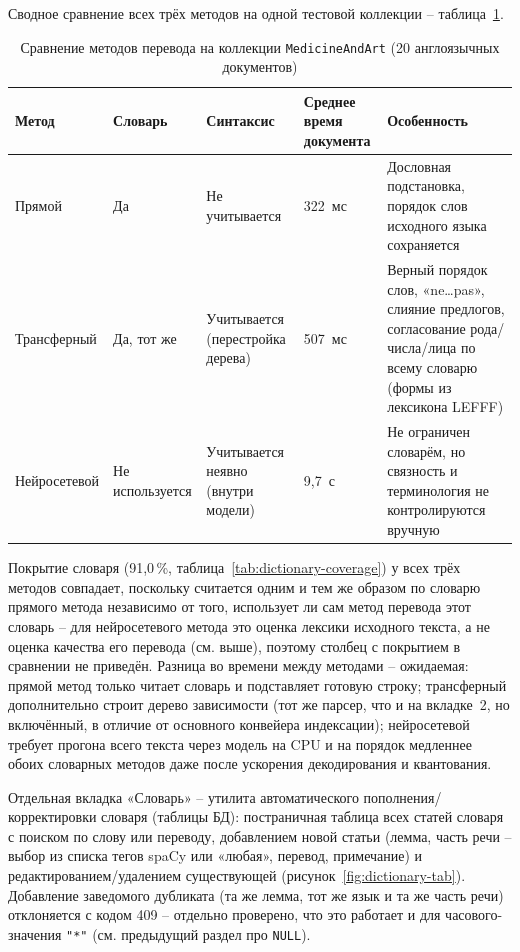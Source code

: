 Сводное сравнение всех трёх методов на одной тестовой коллекции --
таблица~\ref{tab:method-comparison}.

\begin{table}[H]
  \centering
  \caption{Сравнение методов перевода на коллекции \texttt{MedicineAndArt} (20 англоязычных документов)}
  \label{tab:method-comparison}
  \small
  \begin{tabularx}{\textwidth}{|l|X|X|X|X|}
    \hline
    Метод & Словарь & Синтаксис & Среднее время документа & Особенность \\
    \hline
    Прямой & Да & Не учитывается & 322~мс & Дословная подстановка, порядок слов исходного языка сохраняется \\
    \hline
    Трансферный & Да, тот же & Учитывается (перестройка дерева) & 507~мс & Верный порядок слов, «ne\ldots pas», слияние предлогов, согласование рода/числа/лица по всему словарю (формы из лексикона LEFFF) \\
    \hline
    Нейросетевой & Не используется & Учитывается неявно (внутри модели) & 9{,}7~с & Не ограничен словарём, но связность и терминология не контролируются вручную \\
    \hline
  \end{tabularx}
\end{table}

Покрытие словаря (91{,}0\,\%, таблица~\ref{tab:dictionary-coverage}) у
всех трёх методов совпадает, поскольку считается одним и тем же образом
по словарю прямого метода независимо от того, использует ли сам метод
перевода этот словарь -- для нейросетевого метода это оценка лексики
исходного текста, а не оценка качества его перевода (см. выше), поэтому
столбец с покрытием в сравнении не приведён. Разница во времени между
методами -- ожидаемая: прямой метод только читает словарь и подставляет
готовую строку; трансферный дополнительно строит дерево зависимости
(тот же парсер, что и на вкладке~2, но включённый, в отличие от
основного конвейера индексации); нейросетевой требует прогона всего
текста через модель на CPU и на порядок медленнее обоих словарных
методов даже после ускорения декодирования и квантования.


Отдельная вкладка «Словарь» -- утилита автоматического
пополнения/корректировки словаря (таблицы БД): постраничная таблица всех статей
словаря с поиском по слову или переводу, добавлением новой статьи
(лемма, часть речи -- выбор из списка тегов spaCy или «любая», перевод,
примечание) и редактированием/удалением существующей
(рисунок~\ref{fig:dictionary-tab}). Добавление заведомого дубликата
(та же лемма, тот же язык и та же часть речи) отклоняется с кодом 409
-- отдельно проверено, что это работает и для часового-значения
\texttt{"*"} (см. предыдущий раздел про \texttt{NULL}).

